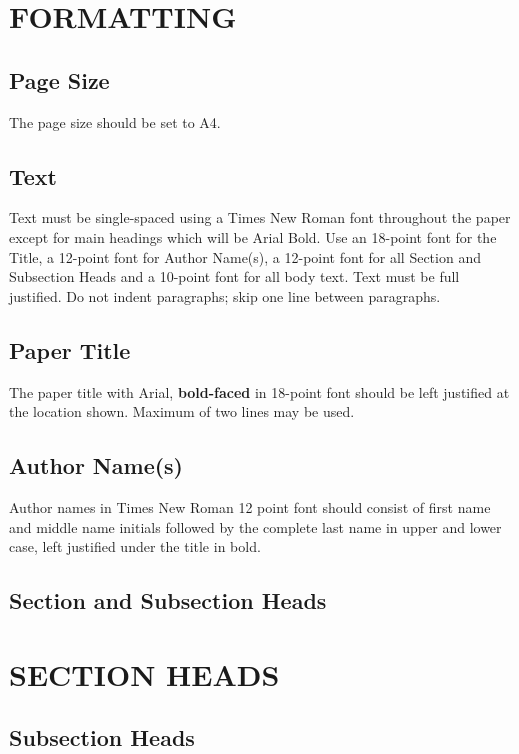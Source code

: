 
\section{FORMATTING}

\subsection{Page Size} 
The page size should be set to A4.

\subsection{Text}
Text must be single-spaced using a Times New Roman font throughout the paper except for main headings which will be Arial Bold. Use an 18-point font for the Title, a 12-point font for Author Name(s), a 12-point font for all Section and Subsection Heads and a 10-point font for all body text.  Text must be full justified.  Do not indent paragraphs; skip one line between paragraphs.

\subsection{Paper Title}
The paper title with Arial, \textbf{bold-faced} in 18-point font should be left justified at the location shown. Maximum of two lines may be used.

\subsection{Author Name(s)}
Author names in Times New Roman 12 point font should consist of first name and middle name initials followed by the complete last name in upper and lower case, left justified under the title in bold.

\subsection{Section and Subsection Heads}

\section{SECTION HEADS} 

\subsection{Subsection Heads} 

